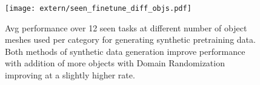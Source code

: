 \begin{figure}[h]
    \centering
    \texttt{[image: extern/seen\_finetune\_diff\_objs.pdf]}
    \vspace{-4mm}
    \caption{Avg performance over 12 seen tasks at different number of object meshes used per category for generating synthetic pretraining data. Both methods of synthetic data generation improve performance with addition of more objects with Domain Randomization improving at a slightly higher rate.}
    \label{fig:diff_num_objs} \vspace{-2mm}
\end{figure}
